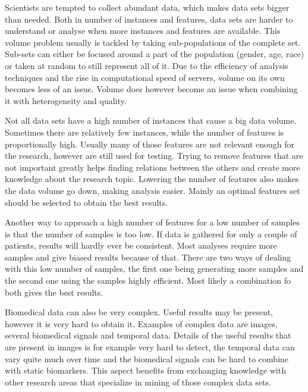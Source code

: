 \documentclass[10pt,a4paper]{article}
\begin{document}
	Scientists are tempted to collect abundant data, which makes data sets bigger than needed. Both in number of instances and features, data sets are harder to understand or analyse when more instances and features are available.\cite{chen2006medical} This volume problem usually is tackled by taking sub-populations of the complete set. Sub-sets can either be focused around a part of the population (gender, age, race) or taken at random to still represent all of it. Due to the efficiency of analysis techniques and the rise in computational speed of servers\cite{blythe2008rise}, volume on its own becomes less of an issue. Volume does however become an issue when combining it with heterogeneity and quality\cite{Turkay2014, Holzinger2014}.
	
	Not all data sets have a high number of instances that cause a big data volume. Sometimes there are relatively few instances, while the number of features is proportionally high\cite{dubitzky2007fundamentals}. Usually many of those features are not relevant enough for the research, however are still used for testing. Trying to remove features that are not important greatly helps finding relations between the others and create more knowledge about the research topic. Lowering the number of features also makes the data volume go down, making analysis easier. Mainly an optimal features set should be selected to obtain the best results\cite{PENG201015}.
	
	Another way to approach a high number of features for a low number of samples is that the number of samples is too low. If data is gathered for only a couple of patients, results will hardly ever be consistent. Most analyses require more samples and give biased results because of that. There are two ways of dealing with this low number of samples, the first one being generating more samples\cite{dunbar2006spatial, devroye1986sample} and the second one using the samples highly efficient\cite{van2002gene, roff1989statistical}. Most likely a combination fo both gives the best results. 
	
	Biomedical data can also be very complex. Useful results may be present, however it is very hard to obtain it. Examples of complex data are images, several biomedical signals and temporal data. Details of the useful results that are present in images is for example very hard to detect, the temporal data can vary quite much over time and the biomedical signals can be hard to combine with static biomarkers.\cite{Yoo2012} This aspect benefits from exchanging knowledge with other research areas that specialize in mining of those complex data sets\cite{Turkay2014, bellazzi2011data}.
	
\end{document}
